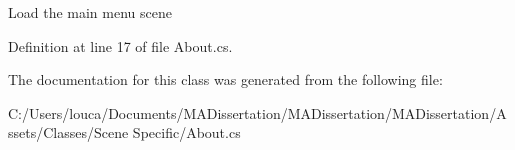 Load the main menu scene 



Definition at line 17 of file About.\+cs.



The documentation for this class was generated from the following file\+:\begin{DoxyCompactItemize}
\item 
C\+:/\+Users/louca/\+Documents/\+M\+A\+Dissertation/\+M\+A\+Dissertation/\+M\+A\+Dissertation/\+Assets/\+Classes/\+Scene Specific/About.\+cs\end{DoxyCompactItemize}
